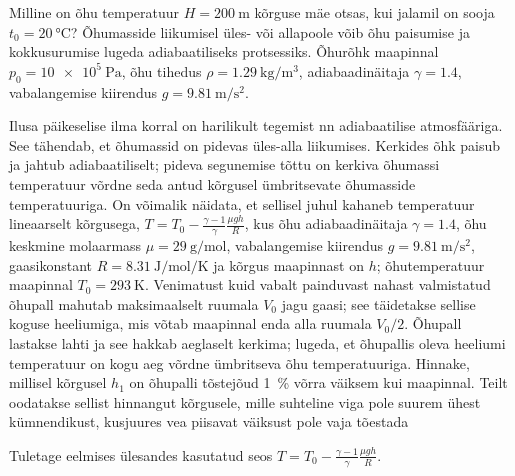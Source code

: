\documentclass[a4paper,11pt,twocolumn]{article}
\begin{document}
\begin{question}
	Milline on õhu temperatuur \(  H = \SI{200}{\m} \) kõrguse mäe otsas, kui jalamil on sooja \( t_0 = \SI{20}{\degreeCelsius} \)? Õhumasside liikumisel üles- või allapoole võib õhu paisumise ja kokkusurumise lugeda adiabaatiliseks protsessiks. Õhurõhk maapinnal \( p_0 = \SI{10e5}{\pascal} \), õhu tihedus \( \rho = \SI{1,29}{\kg\per\m\cubed} \), adiabaadinäitaja \( \gamma = \num{1,4} \), vabalangemise kiirendus \( g = \SI{9,81}{\m\per\s\squared}  \).
\end{question}
\begin{question}[Lõppv 2018, G8]
	Ilusa päikeselise ilma korral on harilikult tegemist nn adiabaatilise atmosfääriga. See tähendab, et õhumassid on pidevas üles-alla liikumises. Kerkides õhk paisub ja jahtub adiabaatiliselt; pideva segunemise tõttu on kerkiva õhumassi temperatuur võrdne seda antud kõrgusel ümbritsevate õhumasside temperatuuriga. On võimalik näidata, et sellisel juhul kahaneb temperatuur lineaarselt kõrgusega, \( T=T_0-\frac{\gamma-1}{\gamma}\frac{\mu g h}{R} \), kus õhu adiabaadinäitaja \( \gamma = \num{1,4} \), õhu keskmine molaarmass \( \mu = \SI{29}{\g\per\mol} \), vabalangemise kiirendus \( g = \SI{9,81}{\m\per\s\squared}  \), gaasikonstant \( R = \SI{8,31}{\J\per\mol\per\K}\) ja kõrgus maapinnast on \( h \); õhutemperatuur maapinnal \( T_0 = \SI{293}{\K} \). Venimatust kuid vabalt painduvast nahast valmistatud õhupall mahutab maksimaalselt ruumala \( V_0 \) jagu gaasi; see täidetakse sellise koguse heeliumiga, mis võtab maapinnal enda alla ruumala \( V_0/2 \). Õhupall lastakse lahti ja see hakkab aeglaselt kerkima; lugeda, et õhupallis oleva heeliumi temperatuur on kogu aeg võrdne ümbritseva õhu temperatuuriga. Hinnake, millisel kõrgusel \( h_1 \) on õhupalli tõstejõud \SI{1}{\percent} võrra väiksem kui maapinnal. Teilt oodatakse sellist hinnangut kõrgusele, mille suhteline viga pole suurem ühest kümnendikust, kusjuures vea piisavat väiksust pole vaja tõestada
\end{question}
\begin{question}
	Tuletage eelmises ülesandes kasutatud seos \( T=T_0-\frac{\gamma-1}{\gamma}\frac{\mu g h}{R} \).
\end{question}
\end{document}
